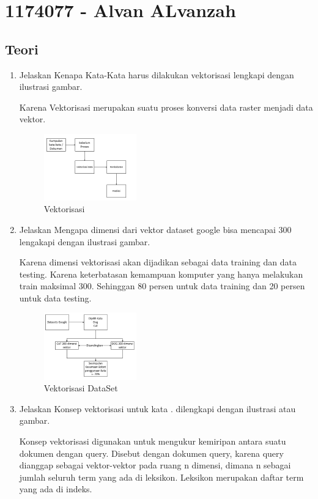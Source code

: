 \section{1174077 - Alvan ALvanzah}

\subsection{Teori}
\begin{enumerate}

\item Jelaskan Kenapa Kata-Kata harus dilakukan vektorisasi lengkapi dengan ilustrasi gambar.\par
Karena Vektorisasi merupakan suatu proses konversi data raster menjadi data vektor.

\begin{figure}[H]
\includegraphics[width=4cm]{figures/1174077/5/1-1.PNG}
\centering
\caption{Vektorisasi}
\end{figure}

\item Jelaskan Mengapa dimensi dari vektor dataset google bisa mencapai 300 lengakapi dengan ilustrasi gambar. \par
Karena dimensi vektorisasi akan dijadikan sebagai data training dan data testing. Karena keterbatasan kemampuan komputer yang hanya melakukan train maksimal 300. Sehinggan 80 persen untuk data training dan 20 persen untuk data testing.

\begin{figure}[H]
\includegraphics[width=4cm]{figures/1174077/5/1-2.PNG}
\centering
\caption{Vektorisasi DataSet}
\end{figure}

\item Jelaskan Konsep vektorisasi untuk kata . dilengkapi dengan ilustrasi atau gambar. \par
Konsep vektorisasi digunakan untuk mengukur kemiripan antara suatu dokumen dengan query. Disebut dengan dokumen query, karena query dianggap sebagai vektor-vektor pada ruang n dimensi, dimana n sebagai jumlah seluruh term yang ada di leksikon. Leksikon merupakan daftar term yang ada di indeks.


\end{enumerate}
